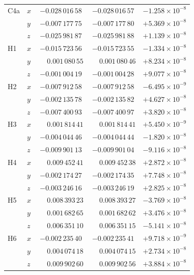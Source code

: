 \begin{longtable}{llccc}
  C4a & $x$ & $-0.028\,016\,58$ & $-0.028\,016\,57$ & $-1.258 \times 10^{-8}$ \\
      & $y$ & $-0.007\,177\,75$ & $-0.007\,177\,80$ & $+5.369 \times 10^{-8}$ \\
      & $z$ & $-0.025\,981\,87$ & $-0.025\,981\,88$ & $+1.139 \times 10^{-8}$ \\[2pt]
  H1  & $x$ & $-0.015\,723\,56$ & $-0.015\,723\,55$ & $-1.334 \times 10^{-8}$ \\
      & $y$ & $\phantom{-}0.001\,080\,55$ & $\phantom{-}0.001\,080\,46$ & $+8.234 \times 10^{-8}$ \\
      & $z$ & $-0.001\,004\,19$ & $-0.001\,004\,28$ & $+9.077 \times 10^{-8}$ \\[2pt]
  H2  & $x$ & $-0.007\,912\,58$ & $-0.007\,912\,58$ & $-6.495 \times 10^{-9}$ \\
      & $y$ & $-0.002\,135\,78$ & $-0.002\,135\,82$ & $+4.627 \times 10^{-8}$ \\
      & $z$ & $-0.007\,400\,93$ & $-0.007\,400\,97$ & $+3.820 \times 10^{-8}$ \\[2pt]
  H3  & $x$ & $\phantom{-}0.001\,814\,41$ & $\phantom{-}0.001\,814\,41$ & $+5.450 \times 10^{-9}$ \\
      & $y$ & $-0.004\,044\,46$ & $-0.004\,044\,44$ & $-1.820 \times 10^{-8}$ \\
      & $z$ & $-0.009\,901\,13$ & $-0.009\,901\,04$ & $-9.116 \times 10^{-8}$ \\[2pt]
  H4  & $x$ & $\phantom{-}0.009\,452\,41$ & $\phantom{-}0.009\,452\,38$ & $+2.872 \times 10^{-8}$ \\
      & $y$ & $-0.002\,174\,27$ & $-0.002\,174\,35$ & $+7.748 \times 10^{-8}$ \\
      & $z$ & $-0.003\,246\,16$ & $-0.003\,246\,19$ & $+2.825 \times 10^{-8}$ \\[2pt]
  H5  & $x$ & $\phantom{-}0.008\,393\,23$ & $\phantom{-}0.008\,393\,27$ & $-3.769 \times 10^{-8}$ \\
      & $y$ & $\phantom{-}0.001\,682\,65$ & $\phantom{-}0.001\,682\,62$ & $+3.476 \times 10^{-8}$ \\
      & $z$ & $\phantom{-}0.006\,351\,10$ & $\phantom{-}0.006\,351\,15$ & $-5.141 \times 10^{-8}$ \\[2pt]
  H6  & $x$ & $-0.002\,235\,40$ & $-0.002\,235\,41$ & $+9.718 \times 10^{-9}$ \\
      & $y$ & $\phantom{-}0.004\,074\,18$ & $\phantom{-}0.004\,074\,15$ & $+2.734 \times 10^{-8}$ \\
      & $z$ & $\phantom{-}0.009\,902\,60$ & $\phantom{-}0.009\,902\,56$ & $+3.884 \times 10^{-8}$ \\[2pt]

\end{longtable}
